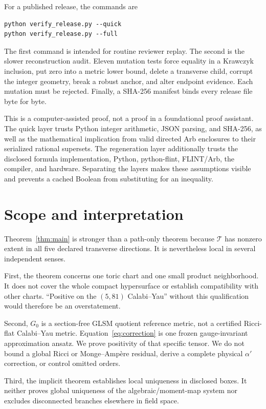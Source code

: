 \documentclass[11pt]{article}
\newcommand{\Gzero}{G_0}
\newcommand{\TT}{\mathcal{T}}
\begin{document}
For a published release, the commands are
\begin{verbatim}
python verify_release.py --quick
python verify_release.py --full
\end{verbatim}
The first command is intended for routine reviewer replay.  The second is the
slower reconstruction audit.  Eleven mutation tests force equality in a Krawczyk
inclusion, put zero into a metric lower bound, delete a transverse child,
corrupt the integer geometry, break a robust anchor, and alter endpoint
evidence.  Each mutation must be rejected.  Finally, a SHA-256 manifest binds
every release file byte for byte.

This is a computer-assisted proof, not a proof in a foundational proof
assistant.  The quick layer trusts Python integer arithmetic, JSON parsing,
and SHA-256, as well as the mathematical implication from valid directed Arb
enclosures to their serialized rational supersets.  The regeneration layer
additionally trusts the disclosed formula implementation, Python, python-flint,
FLINT/Arb, the compiler, and hardware.  Separating the layers makes these
assumptions visible and prevents a cached Boolean from substituting for an
inequality.

\section{Scope and interpretation}

Theorem~\ref{thm:main} is stronger than a path-only theorem because $\TT$ has
nonzero extent in all five declared transverse directions.  It is nevertheless
local in several independent senses.

First, the theorem concerns one toric chart and one small product neighborhood.
It does not cover the whole compact hypersurface or establish compatibility
with other charts.  ``Positive on the $(5,81)$ Calabi--Yau'' without this
qualification would therefore be an overstatement.

Second, $\Gzero$ is a section-free GLSM quotient reference metric, not a
certified Ricci-flat Calabi--Yau metric.  Equation~\eqref{eq:correction} is one
frozen gauge-invariant approximation ansatz.  We prove positivity of that
specific tensor.  We do not bound a global Ricci or Monge--Amp\`ere residual,
derive a complete physical $\alpha'$ correction, or control omitted orders.

Third, the implicit theorem establishes local uniqueness in disclosed boxes.
It neither proves global uniqueness of the algebraic/moment-map system nor
excludes disconnected branches elsewhere in field space.
\end{document}
